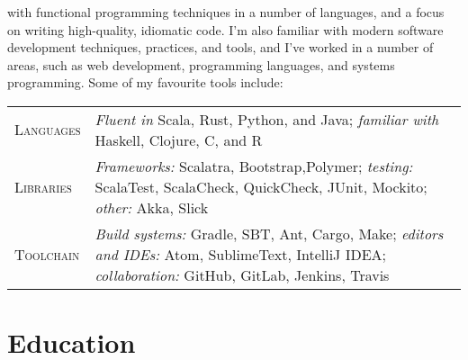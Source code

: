 \documentclass[a4paper]{tufte-handout}
\begin{document}
\begin{fullwidth}

\noindent
{} with functional programming techniques in a number of languages, and a focus on writing high-quality, idiomatic code. I'm also familiar with modern software development techniques, practices, and tools, and I've worked in a number of areas, such as web development, programming languages, and systems programming. Some of my favourite tools include: \\
    \footnotesize
\begin{tabular}{ l p{12.5cm} }

\textsc{Languages} & \emph{Fluent in} Scala, Rust, Python, and Java; \emph{familiar with} Haskell, Clojure, C, and R \\
\textsc{Libraries} & \emph{Frameworks:} Scalatra, Bootstrap,Polymer; \emph{testing:} ScalaTest, ScalaCheck, QuickCheck, JUnit, Mockito; \emph{other:} Akka, Slick \\
\textsc{Toolchain} & \emph{Build systems:} Gradle, SBT, Ant, Cargo, Make; \emph{editors and IDEs:} Atom, SublimeText, IntelliJ IDEA; \emph{collaboration:} GitHub, GitLab, Jenkins, Travis
\end{tabular}
\end{fullwidth}

\section{Education}
\end{document}
